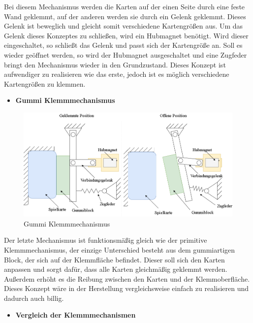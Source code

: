 Bei diesem Mechanismus werden die Karten auf der einen Seite durch eine feste Wand geklemmt, auf der anderen werden sie durch ein Gelenk geklemmt.
Dieses Gelenk ist beweglich und gleicht somit verschiedene Kartengrößen aus.
Um das Gelenk dieses Konzeptes zu schließen, wird ein Hubmagnet benötigt.
Wird dieser eingeschaltet, so schließt das Gelenk und passt sich der Kartengröße an.
Soll es wieder geöffnet werden, so wird der Hubmagnet ausgeschaltet und eine Zugfeder bringt den Mechanismus wieder in den Grundzustand.
Dieses Konzept ist aufwendiger zu realisieren wie das erste, jedoch ist es möglich verschiedene Kartengrößen zu klemmen.

\begin{itemize}
    \item \textbf{Gummi Klemmmechanismus}
\end{itemize}

\begin{figure}[H]
    \centering
    \includegraphics[scale=0.5,page=1]{fig/mech/Klemmmechanissmus-Page-3.png}
    \caption{Gummi Klemmmechanismus}
\end{figure}

Der letzte Mechanismus ist funktionsmäßig gleich wie der primitive Klemmmechanismus, der einzige Unterschied besteht aus dem
gummiartigen Block, der sich auf der Klemmfläche befindet.
Dieser soll sich den Karten anpassen und sorgt dafür, dass alle Karten gleichmäßig geklemmt werden.
Außerdem erhöht es die Reibung zwischen den Karten und der Klemmoberfläche.
Dieses Konzept wäre in der Herstellung vergleichsweise einfach zu realisieren und dadurch auch billig.


\begin{itemize}
    \item \textbf{Vergleich der Klemmmechanismen}
\end{itemize}

